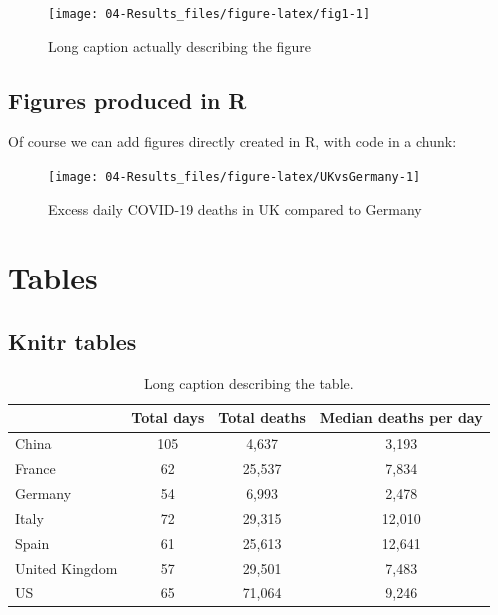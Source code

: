 \documentclass[12pt,]{book}
\begin{document}
\begin{figure}
\texttt{[image: 04-Results\_files/figure-latex/fig1-1]} \caption[Short caption for the table of figures]{Long caption actually describing the figure}\label{fig:fig1}
\end{figure}

\hypertarget{figures-produced-in-r}{%
\subsection{Figures produced in R}\label{figures-produced-in-r}}

Of course we can add figures directly created in R, with code in a chunk:

\begin{figure}
\texttt{[image: 04-Results\_files/figure-latex/UKvsGermany-1]} \caption[R figure: short caption for LoF]{Excess daily COVID-19 deaths in UK compared to Germany}\label{fig:UKvsGermany}
\end{figure}

\hypertarget{tables}{%
\section{Tables}\label{tables}}

\hypertarget{knitr-tables}{%
\subsection{Knitr tables}\label{knitr-tables}}

\begin{table}

\caption[Knitr table: short caption for LoT]{\label{tab:table1}Long caption describing the table.}
\centering
\begin{tabular}[t]{lccc}
\toprule
  & Total days & Total deaths & Median deaths per day\\
\midrule
China & 105 & 4,637 & 3,193\\
France & 62 & 25,537 & 7,834\\
Germany & 54 & 6,993 & 2,478\\
Italy & 72 & 29,315 & 12,010\\
Spain & 61 & 25,613 & 12,641\\
\addlinespace
United Kingdom & 57 & 29,501 & 7,483\\
US & 65 & 71,064 & 9,246\\
\bottomrule
\end{tabular}
\end{table}
\end{document}
